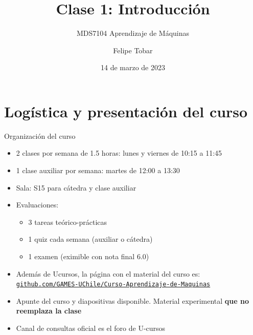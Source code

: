 \documentclass[9pt]{beamer}
\title{Clase 1: Introducción}
\subtitle{MDS7104 Aprendizaje de Máquinas}
\date{14 de marzo de 2023}
\author{Felipe Tobar}
\institute{Iniciativa de Datos e Inteligencia Artificial\\Universidad de Chile}
\begin{document}
\begin{frame}
  \titlepage
\end{frame}

\section{Logística y presentación del curso}
\begin{frame}{Organización del curso}

\begin{itemize}
  \item 2 clases por semana de 1.5 horas: lunes y viernes de 10:15 a 11:45 
  \item 1 clase auxiliar por semana: martes de 12:00 a 13:30
  \item Sala: S15 para cátedra y clase auxiliar
  \item Evaluaciones: 
  \begin{itemize}
    \item 3 tareas teórico-prácticas 
    \item 1 quiz cada semana (auxiliar o cátedra)
    \item 1 examen (eximible con nota final 6.0)
  \end{itemize}
  \item Además de Ucursos, la página con el material del curso es: \href{https://github.com/GAMES-UChile/Curso-Aprendizaje-de-Maquinas}{\tt github.com/GAMES-UChile/Curso-Aprendizaje-de-Maquinas}
  \item Apunte del curso y diapositivas disponible. Material experimental \textbf{que no reemplaza la clase}
  \item Canal de consultas oficial es el foro de U-cursos
\end{itemize}

\end{frame}
\end{document}
